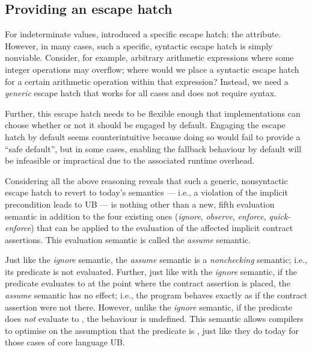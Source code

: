 \subsection{Providing an escape hatch}
\label{assume}

For indeterminate values, \cite{P2795R5} introduced a specific escape hatch: the \tcode{[[indeterminate]]} attribute. However, in many cases, such a specific, syntactic escape hatch is simply nonviable. Consider, for example, arbitrary arithmetic expressions where some integer operations may overflow; where would we place a syntactic escape hatch for a certain arithmetic operation within that expression? Instead, we need a \emph{generic} escape hatch that works for all cases and does not require syntax.

Further, this escape hatch needs to be flexible enough that implementations can choose whether or not it should be engaged by default. Engaging the escape hatch by default seems counterintuitive because doing so would fail to provide a ``safe default'', but in some cases, enabling the fallback behaviour by default will be infeasible or impractical due to the associated runtime overhead.

Considering all the above reasoning reveals that such a generic, nonsyntactic escape hatch to revert to today's semantics --- i.e., a violation of the implicit precondition leads to UB --- is nothing other than a new, fifth evaluation semantic in addition to the four existing ones (\emph{ignore}, \emph{observe}, \emph{enforce}, \emph{quick-enforce}) that can be applied to the evaluation of the affected implicit contract assertions. This evaluation semantic is called the \emph{assume} semantic.

Just like the \emph{ignore} semantic, the \emph{assume} semantic is a \emph{nonchecking} semantic; i.e., its predicate is not evaluated. Further, just like with the \emph{ignore} semantic, if the predicate evaluates to  at the point where the contract assertion is placed, the \emph{assume} semantic has no effect; i.e., the program behaves exactly as if the contract assertion were not there. However, unlike the \emph{ignore} semantic, if the predicate does \emph{not} evaluate to , the behaviour is undefined. This semantic allows compilers to optimise on the assumption that the predicate is , just like they do today for those cases of core language UB.

